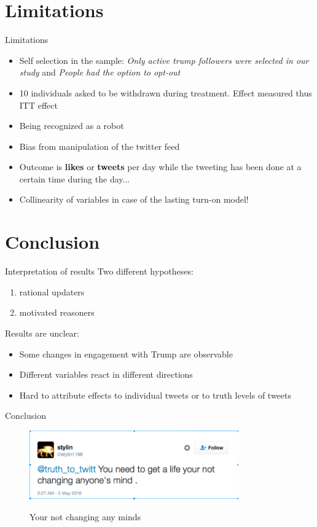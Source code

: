 \documentclass[10pt]{beamer}\usepackage[]{graphicx}\usepackage[]{color}
\begin{document}
\section{Limitations}
\begin{frame}{Limitations}
\begin{itemize}

\item Self selection in the sample: 
\textit{Only active trump followers were selected in our study} and \textit{People had the option to opt-out}
	\item 10 individuals asked to be withdrawn during treatment. Effect measured thus ITT effect
\item Being recognized as a robot
\item Bias from manipulation of the twitter feed
\item Outcome is \textbf{likes} or \textbf{tweets} per day while the tweeting has been done at a certain time during the day...
\item Collinearity of variables in case of the lasting turn-on model!
\end{itemize}
\end{frame}




\section{Conclusion}

\begin{frame}{Interpretation of results}
Two different hypotheses:
\begin{enumerate}
  \item rational updaters
  \item motivated reasoners
\end{enumerate}

Results are unclear:
\begin{itemize}
  \item Some changes in engagement with Trump are observable
  \item Different variables react in different directions
  \item Hard to attribute effects to individual tweets or to truth levels of tweets
\end{itemize}

\end{frame}

\begin{frame}{Conclusion}

\begin{figure}
\includegraphics[width=9cm]{../minds.png}
\label{fig:minds}
\caption{Your not changing any minds}
\end{figure}

\end{frame}
		
\end{document}
